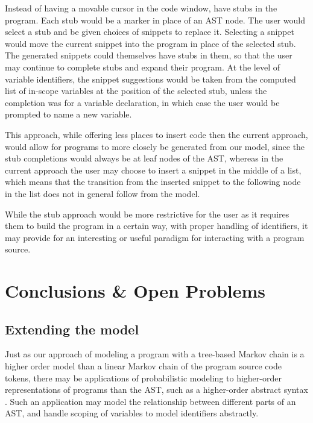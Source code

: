 \documentclass{article}
\begin{document}
Instead of having a movable cursor in the code window, have stubs in the
program. Each stub would be a marker in place of an AST node. The user would
select a stub and be given choices of snippets to replace it. Selecting a
snippet would move the current snippet into the program in place of the selected
stub.  The generated snippets could themselves have stubs in them, so that the
user may continue to complete stubs and expand their program.  At the level of
variable identifiers, the snippet suggestions would be taken from the computed
list of in-scope variables at the position of the selected stub, unless the
completion was for a variable declaration, in which case the user would be
prompted to name a new variable.

This approach, while offering less places to insert code then the current
approach, would allow for programs to more closely be generated from our model,
since the stub completions would always be at leaf nodes of the AST, whereas in
the current approach the user may choose to insert a snippet in the middle of a
list, which means that the transition from the inserted snippet to the following
node in the list does not in general follow from the model.

While the stub approach would be more restrictive for the user as it requires
them to build the program in a certain way, with proper handling of identifiers,
it may provide for an interesting or useful paradigm for interacting with a program
source.

\section{Conclusions \& Open Problems}


\subsection{Extending the model}

Just as our approach of modeling a program with a tree-based Markov chain is a
higher order model than a linear Markov chain of the program source code tokens,
there may be applications of probabilistic modeling to higher-order
representations of programs than the AST, such as a higher-order abstract syntax
\cite{hosa}. Such an application may model the relationship between different
parts of an AST, and handle scoping of variables to model identifiers
abstractly.
\end{document}
